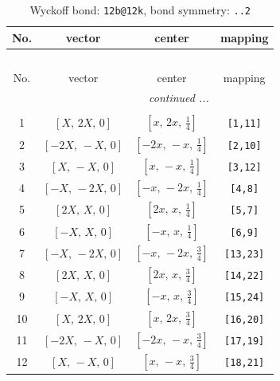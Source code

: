 \documentclass[fleqn,8pt]{jsarticle}
\begin{document}
\begin{longtable}{cccc}
\caption{Wyckoff bond: {\tt 12b@12k}, bond symmetry: {\tt ..2}}
 \\
 \hline \hline
No. & vector & center & mapping \\ \hline \endfirsthead

\multicolumn{3}{l}{\tablename\ \thetable{}} \\
 \hline \hline
No. & vector & center & mapping \\ \hline \endhead

 \hline \hline
\multicolumn{3}{r}{\footnotesize\it continued ...} \\ \endfoot

 \hline \hline
\multicolumn{3}{r}{} \\ \endlastfoot

1 & $\left[ X,\, 2 X,\, 0 \right]$ & $\left[ x,\, 2 x,\, \frac{1}{4} \right]$ & {\tt [1,11]} \\ \hline
2 & $\left[ - 2 X,\, - X,\, 0 \right]$ & $\left[ - 2 x,\, - x,\, \frac{1}{4} \right]$ & {\tt [2,10]} \\ \hline
3 & $\left[ X,\, - X,\, 0 \right]$ & $\left[ x,\, - x,\, \frac{1}{4} \right]$ & {\tt [3,12]} \\ \hline
4 & $\left[ - X,\, - 2 X,\, 0 \right]$ & $\left[ - x,\, - 2 x,\, \frac{1}{4} \right]$ & {\tt [4,8]} \\ \hline
5 & $\left[ 2 X,\, X,\, 0 \right]$ & $\left[ 2 x,\, x,\, \frac{1}{4} \right]$ & {\tt [5,7]} \\ \hline
6 & $\left[ - X,\, X,\, 0 \right]$ & $\left[ - x,\, x,\, \frac{1}{4} \right]$ & {\tt [6,9]} \\ \hline
7 & $\left[ - X,\, - 2 X,\, 0 \right]$ & $\left[ - x,\, - 2 x,\, \frac{3}{4} \right]$ & {\tt [13,23]} \\ \hline
8 & $\left[ 2 X,\, X,\, 0 \right]$ & $\left[ 2 x,\, x,\, \frac{3}{4} \right]$ & {\tt [14,22]} \\ \hline
9 & $\left[ - X,\, X,\, 0 \right]$ & $\left[ - x,\, x,\, \frac{3}{4} \right]$ & {\tt [15,24]} \\ \hline
10 & $\left[ X,\, 2 X,\, 0 \right]$ & $\left[ x,\, 2 x,\, \frac{3}{4} \right]$ & {\tt [16,20]} \\ \hline
11 & $\left[ - 2 X,\, - X,\, 0 \right]$ & $\left[ - 2 x,\, - x,\, \frac{3}{4} \right]$ & {\tt [17,19]} \\ \hline
12 & $\left[ X,\, - X,\, 0 \right]$ & $\left[ x,\, - x,\, \frac{3}{4} \right]$ & {\tt [18,21]} \\
\end{longtable}
\end{document}

